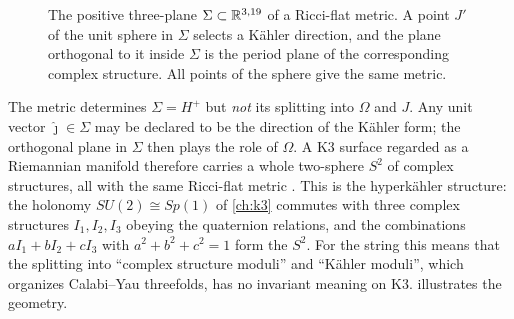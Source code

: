 \begin{figure}[!ht]
\centering
{}
\caption{The positive three-plane $\Sigma\subset\mathbb{R}^{3,19}$ of a Ricci-flat metric. A point
$J'$ of the unit sphere in $\Sigma$ selects a Kähler direction, and the plane orthogonal to
it inside $\Sigma$ is the period plane of the corresponding complex structure. All points of
the sphere give the same metric.}
\label{fig:k3lattice:sigma}
\end{figure}

\begin{physicsbox}
The metric determines $\Sigma=H^+$ but \emph{not} its splitting into $\Omega$ and $J$.
Any unit vector $\hat\jmath\in\Sigma$ may be declared to be the direction of the Kähler form;
the orthogonal plane in $\Sigma$ then plays the role of $\Omega$. A K3 surface regarded as a
Riemannian manifold therefore carries a whole two-sphere $S^2$ of complex structures, all
with the same Ricci-flat metric . This is the hyperkähler
structure: the holonomy $SU(2)\cong Sp(1)$ of \cref{ch:k3} commutes with three complex
structures $I_1,I_2,I_3$ obeying the quaternion relations, and the combinations
$aI_1+bI_2+cI_3$ with $a^2+b^2+c^2=1$ form the $S^2$. For the string this means that the splitting into ``complex structure moduli''
and ``Kähler moduli'', which organizes Calabi--Yau threefolds, has no invariant meaning on
K3.  illustrates the geometry.
\end{physicsbox}

